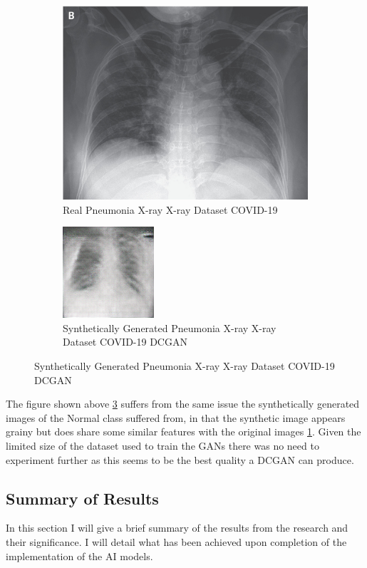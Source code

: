 \begin{figure}[H]
    \centering
    \begin{subfigure}{.4\textwidth}
    \centering
      \includegraphics[width=.4\linewidth,keepaspectratio]{Images/ExampleOfPneumoniaXrayXrayCOVID19Dataset.jpeg}
      \caption{Real Pneumonia X-ray X-ray Dataset COVID-19}
      \label{fig:Real Pneumonia X-ray X-ray Dataset COVID-19}
    \end{subfigure}\hfill%
    \begin{subfigure}{.4\textwidth}
    \centering
      \includegraphics[width=.4\linewidth,keepaspectratio]{Images/ExampleOfSyntheticallyGeneratedPneumoniaXrayCOVID19XrayDatasetDCGAN.png}
      \caption{Synthetically Generated Pneumonia X-ray X-ray Dataset COVID-19 DCGAN}
      \label{fig:Synthetically Generated Pneumonia X-ray X-ray Dataset COVID-19 DCGAN}
    \end{subfigure}\hfill%
\end{figure}
The figure shown above \ref{fig:Synthetically Generated Pneumonia X-ray X-ray Dataset COVID-19 DCGAN} suffers from the same issue the synthetically generated images of the Normal class suffered from, in that the synthetic image appears grainy but does share some similar features with the original images \ref{fig:Real Pneumonia X-ray X-ray Dataset COVID-19}.  Given the limited size of the dataset used to train the GANs there was no need to experiment further as this seems to be the best quality a DCGAN can produce.
\subsection{Summary of Results}
In this section I will give a brief summary of the results from the research and their significance.  I will detail what has been achieved upon completion of the implementation of the AI models.
